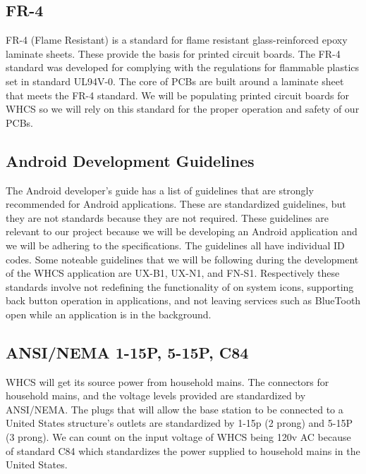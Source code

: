 \subsection{FR{}-4}
FR{}-4 (Flame Resistant) is a standard for flame resistant
glass{}-reinforced epoxy laminate sheets. These provide the basis for printed
circuit boards. The FR{}-4 standard was developed for complying with the
regulations for flammable plastics set in standard UL94V{}-0. The core of PCBs
are built around a laminate sheet that meets the FR{}-4 standard.  We will be
populating printed circuit boards for WHCS so we will rely on this standard for
the proper operation and safety of our PCBs.

\subsection{Android Development Guidelines}
The Android developer{}'s guide has a list of guidelines that
are strongly recommended for Android applications. These are standardized
guidelines, but they are not standards because they are not required. These
guidelines are relevant to our project because we will be developing an Android
application and we will be adhering to the specifications. The guidelines all
have individual ID codes. Some noteable guidelines that we will be following
during the development of the WHCS application are UX{}-B1, UX{}-N1, and
FN{}-S1. Respectively these standards involve not redefining the functionality
of on system icons, supporting back button operation in applications, and not
leaving services such as BlueTooth open while an application is in the
background.

\subsection{ANSI/NEMA 1-15P, 5-15P, C84}
WHCS will get its source power from household mains. The
connectors for household mains, and the voltage levels provided are
standardized by ANSI/NEMA. The plugs that will allow the base station to be
connected to a United States structure{}'s outlets are standardized by 1-15p (2
prong) and 5-15P (3 prong). We can count on the input voltage of WHCS being
120v AC because of standard C84 which standardizes the power supplied to
household mains in the United States.
